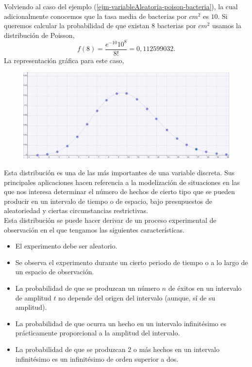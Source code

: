 \begin{Ejm}
    Volviendo al caso del ejemplo (\ref{ejm-variableAleatoria-poison-bacteria}), la cual adicionalmente conocemos que la tasa media de bacterias por $cm^2$ es $10$. Si queremos calcular la probabilidad de que existan $8$ bacterias por $cm^2$ usamos la distribución de Poisson, 
    $$f(8)=\frac{e^{-10} 10^{8}}{8!}=  0,112599032. $$ La representación gráfica para este caso,
    \begin{figure}
        \includegraphics[width=15cm]{Cap1-Probabilidad/img/poisson.png}
    \end{figure}
\end{Ejm}
Esta distribución es una de las más importantes de una variable discreta. Sus principales aplicaciones hacen referencia a la modelización de situaciones en las que nos interesa determinar el número de hechos de cierto tipo que se pueden producir en un intervalo de tiempo o de espacio, bajo presupuestos de aleatoriedad y ciertas circunstancias restrictivas.\\
Esta distribución se puede hacer derivar de un proceso experimental de observación en el que tengamos las siguientes características.
\begin{itemize}
    \item El experimento debe ser aleatorio.
    \item Se observa el experimento durante un cierto periodo de tiempo o a lo largo de un espacio de observación.
    \item La probabilidad de que se produzcan un número $n$ de éxitos en un intervalo de amplitud $t$ no depende del origen del intervalo (aunque, sí de su amplitud).
    \item La probabilidad de que ocurra un hecho en un intervalo infinitésimo es prácticamente proporcional a la amplitud del intervalo.
    \item La probabilidad de que se produzcan $2$ o más hechos en un intervalo infinitésimo es un infinitésimo de orden superior a dos.
\end{itemize}
